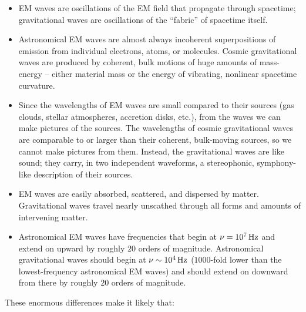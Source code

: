 \documentclass[a4paper,10pt]{article}
\begin{document}
\begin{itemize}
    \item EM waves are oscillations of the EM field that propagate through spacetime; gravitational waves are oscillations of the ``fabric'' of spacetime itself.
    \item Astronomical EM waves are almost always incoherent superpositions of emission from individual electrons, atoms, or molecules. Cosmic gravitational waves are produced by coherent, bulk motions of huge amounts of mass-energy -- either material mass or the energy of vibrating, nonlinear spacetime curvature.
    \item Since the wavelengths of EM waves are small compared to their sources (gas clouds, stellar atmospheres, accretion disks, etc.), from the waves we can make pictures of the sources. The wavelengths of cosmic gravitational waves are comparable to or larger than their coherent, bulk-moving sources, so we cannot make pictures from them. Instead, the gravitational waves are like sound; they carry, in two independent waveforms, a stereophonic, symphony-like description of their sources.
    \item EM waves are easily absorbed, scattered, and dispersed by matter. Gravitational waves travel nearly unscathed through all forms and amounts of intervening matter.
    \item Astronomical EM waves have frequencies that begin at $\nu=10^7\,{\rm Hz}$ and extend on upward by roughly $20$ orders of magnitude. Astronomical gravitational waves should begin at $\nu\sim10^4\,{\rm Hz}$ ($1000$-fold lower than the lowest-frequency astronomical EM waves) and should extend on downward from there by roughly $20$ orders of magnitude.
\end{itemize}

{\noindent}These enormous differences make it likely that:
\end{document}
